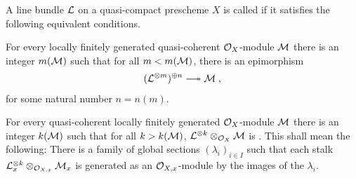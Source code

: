 \documentclass[a4paper,parskip=half,numbers=enddot, DIV=12]{scrreprt}
\begin{document}
\begin{defi}
	A line bundle $\mathcal{L}$ on a quasi-compact prescheme $X$ is called  if it satisfies the following equivalent conditions.
	\begin{alphanumerate}
		\item For every locally finitely generated quasi-coherent $\mathcal{O}_X$-module $\mathcal{M}$ there is an integer $m(\mathcal{M})$ such that for all $m<m(\mathcal{M})$, there is an epimorphism
		\begin{align*}
		(\Ll^{\otimes m})^{\oplus n}\epimorphism \Mm\;,
		\end{align*}
		for some natural number $n=n(m)$.
		\item For every quasi-coherent locally finitely generated $\mathcal{O}_X$-module $\mathcal{M}$ there is an integer $k(\mathcal{M})$ such that for all $k>k(\mathcal{M})$, $\mathcal{L}^{\otimes k}\otimes_{\mathcal{O}_X}\mathcal{M}$ is . This shall mean the following: There is a family of global sections $(\lambda_i)_{i\in I}$ such that each stalk $\mathcal{L}_x^{\otimes k}\otimes_{\mathcal{O}_{X,x}}\mathcal{M}_x$ is generated as an $\mathcal{O}_{X,x}$-module by the images of the $\lambda_i$.
	\end{alphanumerate}
\end{defi}
\end{document}
